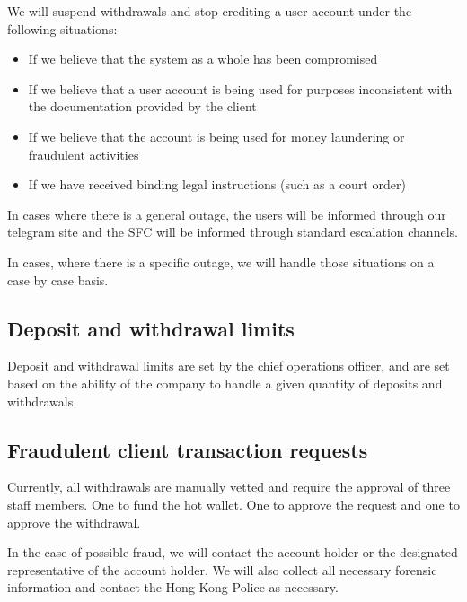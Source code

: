 We will suspend withdrawals and stop crediting a user account under
the following situations:
\begin{itemize}
\item If we believe that the system as a whole has been compromised
\item If we believe that a user account is being used for purposes
  inconsistent with the documentation provided by the client
\item If we believe that the account is being used for money
  laundering or fraudulent activities
\item If we have received binding legal instructions (such as a court order)
\end{itemize}

In cases where there is a general outage, the users will be informed
through our telegram site and the SFC will be informed through
standard escalation channels.

In cases, where there is a specific outage, we will handle those
situations on a case by case basis.

\subsection{Deposit and withdrawal limits}
Deposit and withdrawal limits are set by the chief operations officer,
and are set based on the ability of the company to handle a given
quantity of deposits and withdrawals.

\subsection{Fraudulent client transaction requests}
Currently, all withdrawals are manually vetted and require the approval
of three staff members.  One to fund the hot wallet.  One to approve
the request and one to approve the withdrawal.

In the case of possible fraud, we will contact the account holder or the
designated representative of the account holder.  We will also collect
all necessary forensic information and contact the Hong Kong Police as
necessary.



